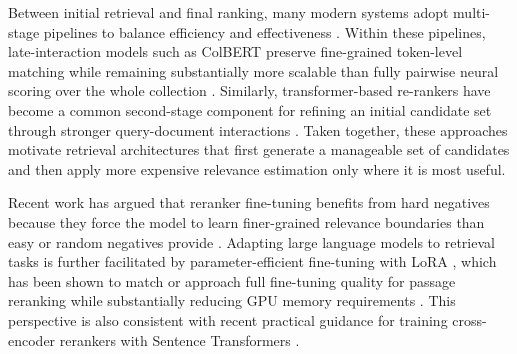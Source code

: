 Between initial retrieval and final ranking, many modern systems adopt multi-stage pipelines to balance efficiency and effectiveness \citep{MarchesinEtAl2020}. Within these pipelines, late-interaction models such as ColBERT preserve fine-grained token-level matching while remaining substantially more scalable than fully pairwise neural scoring over the whole collection \citep{khattab2020colbert}. Similarly, transformer-based re-rankers have become a common second-stage component for refining an initial candidate set through stronger query-document interactions \citep{NogueiraEtAl2020}. Taken together, these approaches motivate retrieval architectures that first generate a manageable set of candidates and then apply more expensive relevance estimation only where it is most useful.

Recent work has argued that reranker fine-tuning benefits from hard negatives because they force the model to learn finer-grained relevance
boundaries than easy or random negatives provide \citep{MeghwaniEtAl2025HardNegatives}. Adapting large language models to retrieval tasks is further facilitated by parameter-efficient fine-tuning with LoRA \citep{hu2022lora}, which has been shown to match or approach full fine-tuning quality for passage reranking while substantially reducing GPU memory requirements \citep{nijasure2025relevance}. This perspective is also consistent with recent practical guidance for training cross-encoder rerankers with Sentence Transformers \citep{Aarsen2025TrainReranker}.
